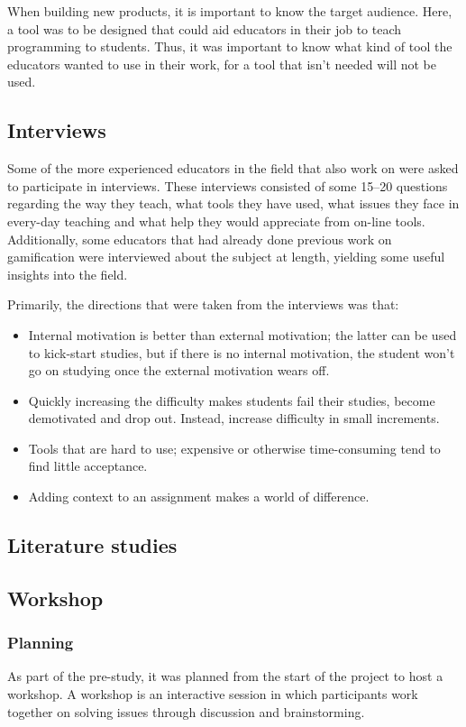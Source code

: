 When building new products, it is important to know the target audience. Here, a tool was to be designed that could aid educators in their job to teach programming to students. Thus, it was important to know what kind of tool the educators wanted to use in their work, for a tool that isn't needed will not be used.

\subsection{Interviews}
Some of the more experienced educators in the field that also work on \LTU{} were asked to participate in interviews. These interviews consisted of some 15--20 questions regarding the way they teach, what tools they have used, what issues they face in every-day teaching and what help they would appreciate from on-line tools. Additionally, some educators that had already done previous work on gamification were interviewed about the subject at length, yielding some useful insights into the field.

Primarily, the directions that were taken from the interviews was that:
\begin{itemize}
\item Internal motivation is better than external motivation; the latter can be used to kick-start studies, but if there is no internal motivation, the student won't go on studying once the external motivation wears off.
\item Quickly increasing the difficulty makes students fail their studies, become demotivated and drop out. Instead, increase difficulty in small increments.
\item Tools that are hard to use; expensive or otherwise time-consuming tend to find little acceptance.
\item Adding context to an assignment makes a world of difference.
\end{itemize}

\subsection{Literature studies}

\subsection{Workshop}
\subsubsection{Planning}
As part of the pre-study, it was planned from the start of the project to host a workshop. A workshop is an interactive session in which participants work together on solving issues through discussion and brainstorming\cite{workshop}. 

